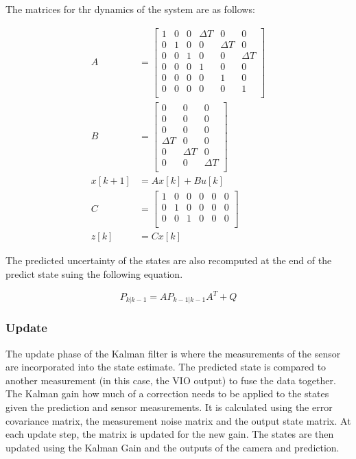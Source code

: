 \documentclass[bare_jrnl_transmag]{subfiles}
\begin{document}
The matrices for thr dynamics of the system are as follows:

\begin{align*}
    A &= 
    \begin{bmatrix}
    1 & 0 & 0 & \Delta T & 0 & 0 \\
    0 & 1 & 0 & 0 & \Delta T & 0 \\
    0 & 0 & 1 & 0 & 0 & \Delta T \\
    0 & 0 & 0 & 1 & 0 & 0 \\
    0 & 0 & 0 & 0 & 1 & 0 \\
    0 & 0 & 0 & 0 & 0 & 1 \\
    \end{bmatrix}
    \\[1em]
    B &= 
    \begin{bmatrix}
    0 & 0 & 0 \\
    0 & 0 & 0 \\
    0 & 0 & 0 \\
    \Delta T & 0 & 0 \\
    0 & \Delta T & 0 \\
    0 & 0 & \Delta T \\
    \end{bmatrix}
    \\[1em]
    x[k+1] &= A x[k] + B u[k]
    \\[1em]
    C &= 
    \begin{bmatrix}
    1 & 0 & 0 & 0 & 0 & 0 \\
    0 & 1 & 0 & 0 & 0 & 0 \\
    0 & 0 & 1 & 0 & 0 & 0 \\
    \end{bmatrix}
    \\[1em]
    z[k] &= C x[k]
\end{align*}

The predicted uncertainty of the states are also recomputed at the end of the predict state suing the following equation.

\begin{equation*}
    P_{k|k-1} = A P_{k-1|k-1} A^T + Q
\end{equation*}

\subsubsection{Update}
The update phase of the Kalman filter is where the measurements of the sensor are incorporated into the state estimate. The predicted state is compared to another measurement (in this case, the VIO output) to fuse the data together. 
The Kalman gain how much of a correction needs to be applied to the states given the prediction and sensor measurements. It is calculated using the error covariance matrix, the measurement noise matrix and the output state matrix. 
At each update step, the matrix is updated for the new gain. The states are then updated using the Kalman Gain and the outputs of the camera and prediction.
\end{document}
